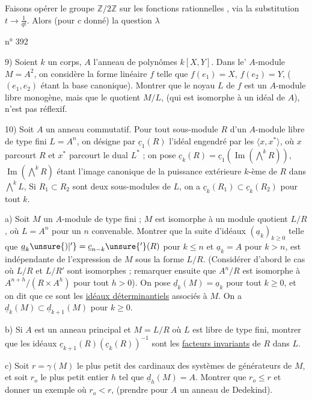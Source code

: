 Faisons opérer le groupe  $\mathbb{Z}/2\mathbb{Z}$ sur les  fonctions rationnelles , via la substitution $t\longrightarrow\frac{1}{qt}$. Alors (pour $c$ donné) la question   $\lambda$

\hfill n° 392

9) Soient $k$ un corps, $A$ l'anneau de polynômes $k[X,Y]$. Dans le' $A$-module $M=A^2$, on considère la forme linéaire $f$ telle que $f(e_1)=X$, $f(e_2)=Y$, ($(e_1,e_2)$ étant la base canonique). Montrer que le noyau $L$ de $f$ est un $A$-module libre monogène, mais que le quotient $M/L$, (qui est isomorphe à un idéal de $A$), n'est pas réflexif.

10) Soit $A$ un anneau commutatif. Pour tout sous-module $R$ d'un $A$-module libre de type fini $L=A^n$, on désigne par $\underline{c}_1(R)$ l'idéal engendré par les $\langle x,x^*\rangle$, où $x$ parcourt $R$ et $x^*$ parcourt le dual $L^*$ ; on pose $\underline{c}_k(R)=\underline{c}_1(\operatorname{Im}(\overset{k}{\bigwedge}R))$, $\operatorname{Im}(\overset{k}{\bigwedge}R)$ étant l'image canonique de la puissance extérieure $k$-ème de $R$ dans $\overset{k}{\bigwedge}L$, Si $R_1\subset R_2$ sont deux sous-modules de $L$, on a $\underline{c}_k(R_1)\subset \underline{c}_k(R_2)$ pour tout $k$.

a) Soit $M$ un $A$-module de type fini ; $M$ est isomorphe à un module quotient $L/R$, où $L=A^n$ pour un $n$ convenable. Montrer que la suite d'idéaux $(\underline{a}_k)_{k\geq0}$ telle que $\underline{a}_k\unsure{)|'}=\underline{c}_{n-k}\unsure{'}(R)$ pour $k\leq n$ et $\underline{a}_k=A$ pour $k>n$, est indépendante de l'expression de $M$ sous la forme $L/R$. (Considérer d'abord le cas où $L/R$ et $L/R'$ sont isomorphes ; remarquer ensuite que $A^n/R$ est isomorphe à $A^{n+h}/(R\times A^h)$ pour tout $h>0$). On pose $\underline{d}_k(M)=\underline{a}_k$ pour tout $k\geq0$, et on dit que ce sont les \uline{idéaux déterminantiels} associés à $M$. On a $\underline{d}_k(M)\subset \underline{d}_{k+1}(M)$ pour $k\geq0$.

b) Si $A$ est un anneau principal et $M=L/R$ où $L$ est libre de type fini, montrer que les idéaux $\underline{c}_{k+1}(R)(\underline{c}_k(R))^{-1}$ sont les \uline{facteurs invariants} de $R$ dans $L$.

c) Soit $r=\gamma(M)$ le plus petit des cardinaux des systèmes de générateurs de $M$, et soit $r_o$ le plus petit entier $h$ tel que $\underline{d}_h(M)=A$. Montrer que $r_o\leq r$ et donner un exemple où $r_o<r$, (prendre pour $A$ un anneau de Dedekind).

